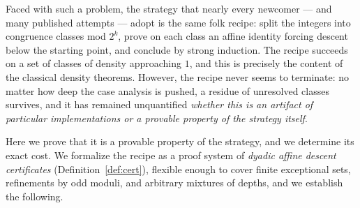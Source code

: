 \documentclass[11pt]{article}
\theoremstyle{definition}
\begin{document}
Faced with such a problem, the strategy that nearly every newcomer --- and
many published attempts --- adopt is the same folk recipe: split the
integers into congruence classes mod $2^k$, prove on each class an affine
identity forcing descent below the starting point, and conclude by strong
induction. The recipe succeeds on a set of classes of density approaching
$1$, and this is precisely the content of the classical density theorems.
However, the recipe never seems to terminate: no matter how deep the case
analysis is pushed, a residue of unresolved classes survives, and it has
remained unquantified \emph{whether this is an artifact of particular
implementations or a provable property of the strategy itself}.

Here we prove that it is a provable property of the strategy, and we
determine its exact cost. We formalize the recipe as a proof system of
\emph{dyadic affine descent certificates} (Definition~\ref{def:cert}),
flexible enough to cover finite exceptional sets, refinements by odd moduli,
and arbitrary mixtures of depths, and we establish the following.
\end{document}
